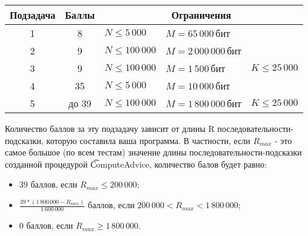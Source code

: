\begin{tabular}{|c|c|lll|}
\hline
\bf{Подзадача}&\bf{Баллы}&\multicolumn{3}{c|}{\bf{Ограничения}}\\\hline
1 & 8 & $N \le 5\,000$ & $M = 65\,000\,бит$&\\\hline
2 & 9 & $N \le 100\,000$ & $M = 2\,000\,000\,бит$&\\\hline
3 & 9 & $N \le 100\,000$ & $M = 1\,500\,бит$ & $K \le 25\,000$\\\hline
4 & 35 & $N \le 5\,000$ & $M = 10\,000\,бит$&\\\hline
5 & до 39 & $N \le 100\,000$ & $M = 1\,800\,000\,бит$ & $K \le 25\,000$\\\hline
\end{tabular}

Количество баллов за эту подзадачу зависит от длины R последовательности-подсказки, которую составила ваша программа. В частности, если $R_{max}$ - это самое большое (по всем тестам) значение длины последовательности-подсказки созданной процедурой \t{ComputeAdvice}, количество балов будет равно:
\begin{itemize}
\item $39$ баллов, если $R_{max} \le 200\,000$;
\item $\frac{39*(1\,800\,000 - R_{max})}{1\,600\,000}$ баллов, если $200\,000 < R_{max} < 1\,800\,000$;
\item $0$ баллов, если $R_{max} \geq 1\,800\,000$.
\end{itemize}